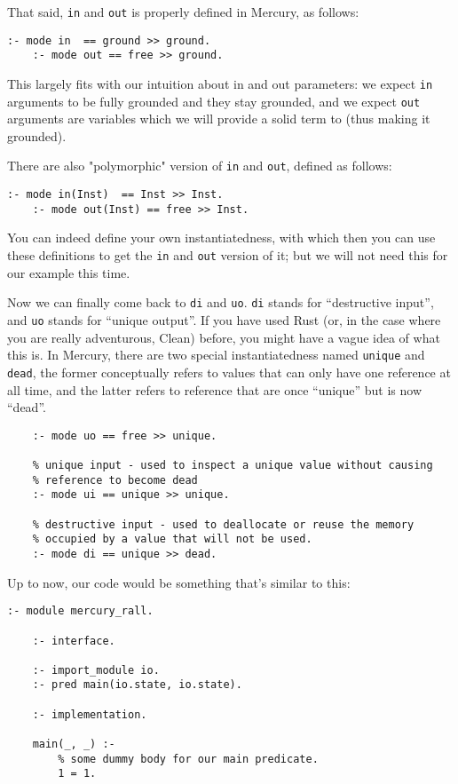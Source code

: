 That said, \texttt{in} and \texttt{out} is properly defined in Mercury, as follows:

\begin{lstlisting}[language=Mercury]
	:- mode in  == ground >> ground.
	:- mode out == free >> ground.
\end{lstlisting}

This largely fits with our intuition about in and out parameters: we expect \texttt{in} arguments to be fully grounded and they stay grounded, and we expect \texttt{out} arguments are variables which we will provide a solid term to (thus making it grounded).

There are also "polymorphic" version of \texttt{in} and \texttt{out}, defined as follows:

\begin{lstlisting}[language=Mercury]
	:- mode in(Inst)  == Inst >> Inst.
	:- mode out(Inst) == free >> Inst.
\end{lstlisting}

You can indeed define your own instantiatedness, with which then you can use these definitions to get the \texttt{in} and \texttt{out} version of it; but we will not need this for our example this time.

Now we can finally come back to \texttt{di} and \texttt{uo}. \texttt{di} stands for ``destructive input'', and \texttt{uo} stands for ``unique output''. If you have used Rust (or, in the case where you are really adventurous, Clean) before, you might have a vague idea of what this is. In Mercury, there are two special instantiatedness named \texttt{unique} and \texttt{dead}, the former conceptually refers to values that can only have one reference at all time, and the latter refers to reference that are once ``unique'' but is now ``dead''.

\begin{lstlisting}[language=Mercury]
	% unique output - used to create a "unique" value
	:- mode uo == free >> unique.
	
	% unique input - used to inspect a unique value without causing
	% reference to become dead
	:- mode ui == unique >> unique.
	
	% destructive input - used to deallocate or reuse the memory
	% occupied by a value that will not be used.
	:- mode di == unique >> dead.
\end{lstlisting}

Up to now, our code would be something that's similar to this:

\begin{lstlisting}[language=Mercury]
	:- module mercury_rall.
	
	:- interface.
	
	:- import_module io.
	:- pred main(io.state, io.state).
	
	:- implementation.
	
	main(_, _) :-
	    % some dummy body for our main predicate.
	    1 = 1.
\end{lstlisting}

